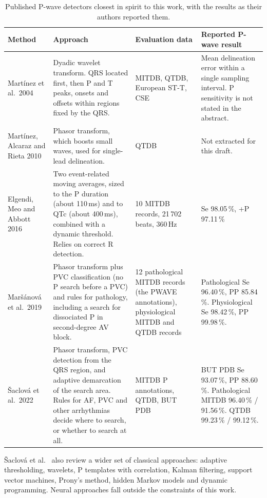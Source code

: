 \documentclass[11pt,a4paper]{article}
\begin{document}
\begin{table}[htbp]
\centering\small
\caption{Published P-wave detectors closest in spirit to this work, with the results as their authors reported them.}
\label{tab:related}
\begin{tabularx}{\textwidth}{>{\raggedright\arraybackslash}p{2.6cm}LL>{\raggedright\arraybackslash}p{3.3cm}}
\toprule
Method & Approach & Evaluation data & Reported P-wave result \\
\midrule
Martínez et al.\ 2004 \cite{martinez2004} & Dyadic wavelet transform. QRS located first, then P and T peaks, onsets and offsets within regions fixed by the QRS. & MITDB, QTDB, European ST-T, CSE & Mean delineation error within a single sampling interval. P sensitivity is not stated in the abstract. \\
Martínez, Alcaraz and Rieta 2010 \cite{martinez2010} & Phasor transform, which boosts small waves, used for single-lead delineation. & QTDB & Not extracted for this draft. \\
Elgendi, Meo and Abbott 2016 \cite{elgendi2016} & Two event-related moving averages, sized to the P duration (about 110\,ms) and to QTc (about 400\,ms), combined with a dynamic threshold. Relies on correct R detection. & 10 MITDB records, 21\,702 beats, 360\,Hz & Se 98.05\,\%, +P 97.11\,\% \\
Maršánová et al.\ 2019 \cite{marsanova2019} & Phasor transform plus PVC classification (no P search before a PVC) and rules for pathology, including a search for dissociated P in second-degree AV block. & 12 pathological MITDB records (the PWAVE annotations), physiological MITDB and QTDB records & Pathological Se 96.40\,\%, PP 85.84\,\%. Physiological Se 98.42\,\%, PP 99.98\,\%. \\
Šaclová et al.\ 2022 \cite{saclova2022} & Phasor transform, PVC detection from the QRS region, and adaptive demarcation of the search area. Rules for AF, PVC and other arrhythmias decide where to search, or whether to search at all. & MITDB P annotations, QTDB, BUT PDB & BUT PDB Se 93.07\,\%, PP 88.60\,\%. Pathological MITDB 96.40\,\% / 91.56\,\%. QTDB 99.23\,\% / 99.12\,\%. \\
\bottomrule
\end{tabularx}
\end{table}

Šaclová et al.\ \cite{saclova2022} also review a wider set of classical approaches: adaptive thresholding, wavelets, P templates with correlation, Kalman filtering, support vector machines, Prony's method, hidden Markov models and dynamic programming. Neural approaches fall outside the constraints of this work.
\end{document}
